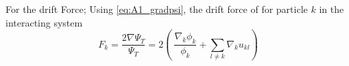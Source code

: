 \documentclass[%
oneside,                 %
final,                   %
10pt]{article}
\begin{document}
\begin{appendices}
For the drift Force;
Using \eqref{eq:A1_gradpsi}, the drift force of for particle $k$ in the interacting system
\begin{equation*}
F_k = \frac{2\nabla \Psi_T}{\Psi_T}= 2 \left(\ \frac{\nabla_k \phi_k}{\phi_k} + \sum_{l\ne k}\nabla_k u_{kl} \right) 
\end{equation*}

\end{appendices}
\end{document}
